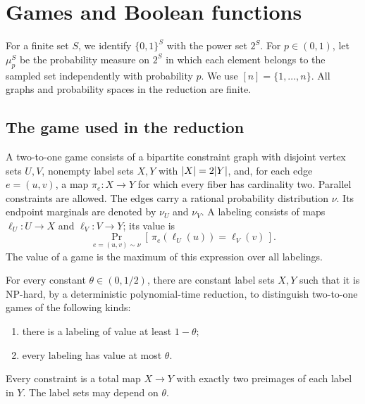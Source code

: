 \section{Games and Boolean functions}
\label{sec:preliminaries}

For a finite set \(S\), we identify \(\{0,1\}^{S}\) with the power set
\(2^{S}\).  For \(p\in(0,1)\), let \(\mu_p^{S}\) be the probability
measure on \(2^{S}\) in which each element belongs to the sampled set
independently with probability \(p\).  We use \([n]=\{1,\ldots,n\}\).
All graphs and probability spaces in the reduction are finite.

\subsection{The game used in the reduction}

A two-to-one game consists of a bipartite constraint graph with disjoint
vertex sets \(U,V\), nonempty label sets \(X,Y\) with
\(\lvert X\rvert=2\lvert Y\rvert\), and, for each edge \(e=(u,v)\), a map
\(\pi_e:X\to Y\) for which every fiber has cardinality two.  Parallel
constraints are allowed.  The edges carry a rational probability
distribution \(\nu\).  Its endpoint marginals are denoted by
\(\nu_U\) and \(\nu_V\).  A labeling consists of maps
\(\ell_U:U\to X\) and \(\ell_V:V\to Y\); its value is
\[
  \Pr_{e=(u,v)\sim\nu}
  [\,\pi_e(\ell_U(u))=\ell_V(v)\,].
\]
The value of a game is the maximum of this expression over all
labelings.

\begin{theorem}
\label{thm:games}
For every constant \(\theta\in(0,1/2)\), there are constant label
sets \(X,Y\) such that it is \(\mathrm{NP}\)-hard, by a deterministic
polynomial-time reduction, to distinguish two-to-one games of the
following kinds:
\begin{enumerate}[label=\textup{(\roman*)}]
  \item there is a labeling of value at least \(1-\theta\);
  \item every labeling has value at most \(\theta\).
\end{enumerate}
Every constraint is a total map \(X\to Y\) with exactly two preimages
of each label in \(Y\).  The label sets may depend on \(\theta\).
\end{theorem}

